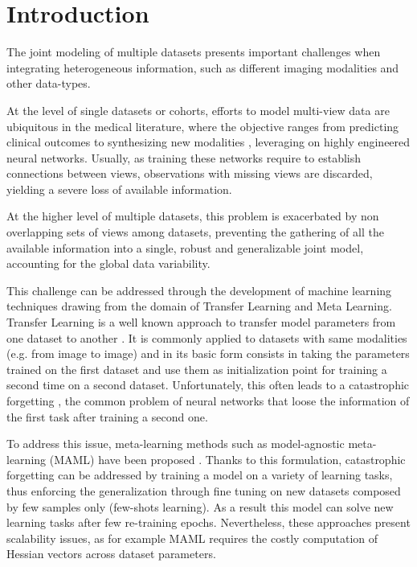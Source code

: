 \section{Introduction}

The joint modeling of multiple datasets presents important challenges when integrating heterogeneous information, such as different imaging modalities and other data-types.

At the level of single datasets or cohorts, efforts to model multi-view data are ubiquitous in the medical literature, where the objective ranges from predicting clinical outcomes \citep{Chen2019} to synthesizing new modalities \citep{Zhou2020, Wei2019}, leveraging on highly engineered neural networks.
Usually, as training these networks require to establish connections between views, observations with missing views are discarded, yielding a severe loss of available information.

At the higher level of multiple datasets, this problem is exacerbated by non overlapping sets of views among datasets, preventing the gathering of all the available information into a single, robust and generalizable joint model, accounting for the global data variability.

This challenge can be addressed through the development of machine learning techniques drawing from the domain of Transfer Learning and Meta Learning.
Transfer Learning is a well known approach to transfer model parameters from one dataset to another \citep{TL}.
It is commonly applied to datasets with same modalities (e.g. from image to image) and in its basic form consists in taking the parameters trained on the first dataset and use them as initialization point for training a second time on a second dataset.
Unfortunately, this often leads to a catastrophic forgetting \citep{CatastroficForgetting}, the common problem of neural networks that loose the information of the first task after training a second one.

To address this issue, meta-learning methods such as model-agnostic meta-learning (MAML) have been proposed \citep{MAML1}.
Thanks to this formulation, catastrophic forgetting can be addressed by training a model on a variety of learning tasks, thus enforcing the generalization through fine tuning on new datasets composed by few samples only (few-shots learning).
As a result this model can solve new learning tasks after few re-training epochs.
Nevertheless, these approaches present scalability issues, as for example MAML requires the costly computation of Hessian vectors across dataset parameters.


